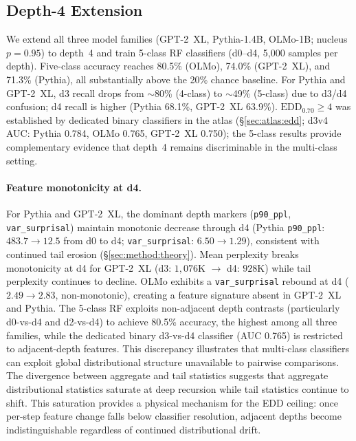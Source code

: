 \subsection{Depth-4 Extension}
\label{app:depth4_ext}

We extend all three model families (GPT-2~XL, Pythia-1.4B, OLMo-1B; nucleus $p{=}0.95$) to depth~4 and train 5-class RF classifiers (d0--d4, 5{,}000 samples per depth).
Five-class accuracy reaches 80.5\% (OLMo), 74.0\% (GPT-2~XL), and 71.3\% (Pythia), all substantially above the 20\% chance baseline.
For Pythia and GPT-2~XL, d3 recall drops from ${\sim}$80\% (4-class) to ${\sim}$49\% (5-class) due to d3/d4 confusion; d4 recall is higher (Pythia 68.1\%, GPT-2~XL 63.9\%).
$\mathrm{EDD}_{0.70} \geq 4$ was established by dedicated binary classifiers in the atlas (\S\ref{sec:atlas:edd}; d3v4 AUC: Pythia 0.784, OLMo 0.765, GPT-2~XL 0.750); the 5-class results provide complementary evidence that depth~4 remains discriminable in the multi-class setting.

\paragraph{Feature monotonicity at d4.}
For Pythia and GPT-2~XL, the dominant depth markers (\texttt{p90\_ppl}, \texttt{var\_surprisal}) maintain monotonic decrease through d4 (Pythia \texttt{p90\_ppl}: $483.7 \to 12.5$ from d0 to d4; \texttt{var\_surprisal}: $6.50 \to 1.29$), consistent with continued tail erosion (\S\ref{sec:method:theory}).
Mean perplexity breaks monotonicity at d4 for GPT-2~XL (d3: $1{,}076\mathrm{K}$ $\to$ d4: $928\mathrm{K}$) while tail perplexity continues to decline.
OLMo exhibits a \texttt{var\_surprisal} rebound at d4 ($2.49 \to 2.83$, non-monotonic), creating a feature signature absent in GPT-2~XL and Pythia.
The 5-class RF exploits non-adjacent depth contrasts (particularly d0-vs-d4 and d2-vs-d4) to achieve 80.5\% accuracy, the highest among all three families, while the dedicated binary d3-vs-d4 classifier (AUC 0.765) is restricted to adjacent-depth features.
This discrepancy illustrates that multi-class classifiers can exploit global distributional structure unavailable to pairwise comparisons.
The divergence between aggregate and tail statistics suggests that aggregate distributional statistics saturate at deep recursion while tail statistics continue to shift.
This saturation provides a physical mechanism for the EDD ceiling: once per-step feature change falls below classifier resolution, adjacent depths become indistinguishable regardless of continued distributional drift.

